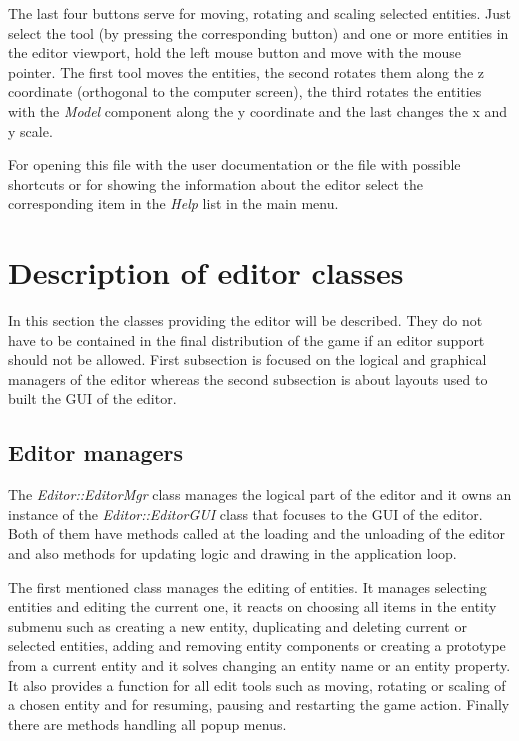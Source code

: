 The last four buttons serve for moving, rotating and scaling selected entities. Just select the tool (by pressing the corresponding button) and one or more entities in the editor viewport, hold the left mouse button and move with the mouse pointer. The first tool moves the entities, the second rotates them along the z coordinate (orthogonal to the computer screen), the third rotates the entities with the \emph{Model} component along the y coordinate and the last changes the x and y scale.

For opening this file with the user documentation or the file with possible shortcuts or for showing the information about the editor select the corresponding item in the \emph{Help} list in the main menu.

\section{Description of editor classes}

In this section the classes providing the editor will be described. They do not have to be contained in the final distribution of the game if an editor support should not be allowed. First subsection is focused on the logical and graphical managers of the editor whereas the second subsection is about layouts used to built the GUI of the editor.

\subsection{Editor managers}

The \emph{Editor::EditorMgr} class manages the logical part of the editor and it owns an instance of the \emph{Editor::EditorGUI} class that focuses to the GUI of the editor. Both of them have methods called at the loading and the unloading of the editor and also methods for updating logic and drawing in the application loop.

The first mentioned class manages the editing of entities. It manages selecting entities and editing the current one, it reacts on choosing all items in the entity submenu such as creating a new entity, duplicating and deleting current or selected entities, adding and removing entity components or creating a prototype from a current entity and it solves changing an entity name or an entity property. It also provides a function for all edit tools such as moving, rotating or scaling of a chosen entity and for resuming, pausing and restarting the game action. Finally there are methods handling all popup menus.

